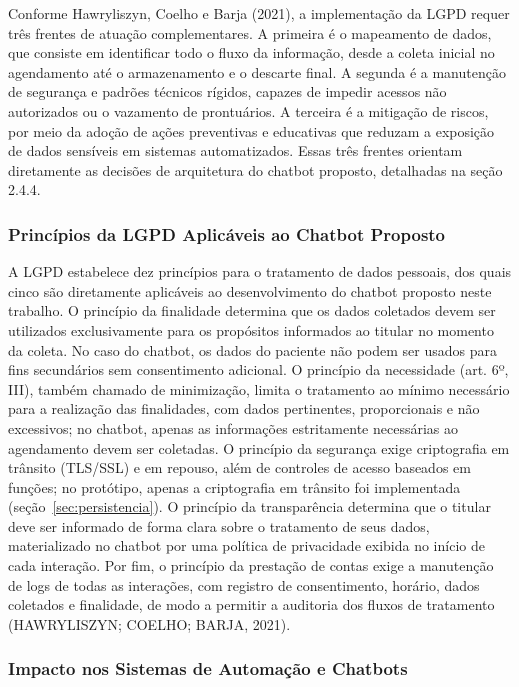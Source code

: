 \documentclass[12pt,a4paper]{extarticle}
\begin{document}
Conforme Hawryliszyn, Coelho e Barja (2021), a implementação da LGPD requer três frentes de atuação complementares. A primeira é o mapeamento de dados, que consiste em identificar todo o fluxo da informação, desde a coleta inicial no agendamento até o armazenamento e o descarte final. A segunda é a manutenção de segurança e padrões técnicos rígidos, capazes de impedir acessos não autorizados ou o vazamento de prontuários. A terceira é a mitigação de riscos, por meio da adoção de ações preventivas e educativas que reduzam a exposição de dados sensíveis em sistemas automatizados. Essas três frentes orientam diretamente as decisões de arquitetura do chatbot proposto, detalhadas na seção 2.4.4.

\subsubsection{Princípios da LGPD Aplicáveis ao Chatbot Proposto}

A LGPD estabelece dez princípios para o tratamento de dados pessoais, dos quais cinco são diretamente aplicáveis ao desenvolvimento do chatbot proposto neste trabalho. O princípio da finalidade determina que os dados coletados devem ser utilizados exclusivamente para os propósitos informados ao titular no momento da coleta. No caso do chatbot, os dados do paciente não podem ser usados para fins secundários sem consentimento adicional. O princípio da necessidade (art. 6º, III), também chamado de minimização, limita o tratamento ao mínimo necessário para a realização das finalidades, com dados pertinentes, proporcionais e não excessivos; no chatbot, apenas as informações estritamente necessárias ao agendamento devem ser coletadas. O princípio da segurança exige criptografia em trânsito (TLS/SSL) e em repouso, além de controles de acesso baseados em funções; no protótipo, apenas a criptografia em trânsito foi implementada (seção~\ref{sec:persistencia}). O princípio da transparência determina que o titular deve ser informado de forma clara sobre o tratamento de seus dados, materializado no chatbot por uma política de privacidade exibida no início de cada interação. Por fim, o princípio da prestação de contas exige a manutenção de logs de todas as interações, com registro de consentimento, horário, dados coletados e finalidade, de modo a permitir a auditoria dos fluxos de tratamento (HAWRYLISZYN; COELHO; BARJA, 2021).

\subsubsection{Impacto nos Sistemas de Automação e Chatbots}
\end{document}
